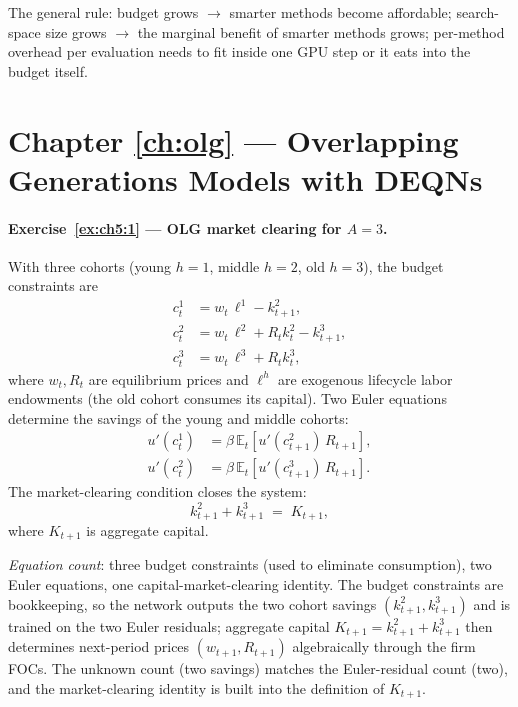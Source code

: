 \documentclass[11pt,a4paper]{report}
\begin{document}
The general rule: budget grows $\to$ smarter methods become affordable; search-space size grows $\to$ the marginal benefit of smarter methods grows; per-method overhead per evaluation needs to fit inside one GPU step or it eats into the budget itself.

\section{Chapter \ref{ch:olg} --- Overlapping Generations Models with DEQNs}
\label{sol:ch5}

\paragraph{Exercise~\ref{ex:ch5:1} --- OLG market clearing for $A=3$.}
With three cohorts (young $h=1$, middle $h=2$, old $h=3$), the budget constraints are
\begin{align*}
   c^1_t &= w_t \,\ell^1 - k^2_{t+1}, \\
   c^2_t &= w_t \,\ell^2 + R_t k^2_t - k^3_{t+1}, \\
   c^3_t &= w_t \,\ell^3 + R_t k^3_t,
\end{align*}
where $w_t, R_t$ are equilibrium prices and $\ell^h$ are exogenous lifecycle labor endowments (the old cohort consumes its capital).  Two Euler equations determine the savings of the young and middle cohorts:
\begin{align*}
u'(c^1_t) &= \beta\,\mathbb{E}_t[u'(c^2_{t+1})\,R_{t+1}], \\
u'(c^2_t) &= \beta\,\mathbb{E}_t[u'(c^3_{t+1})\,R_{t+1}].
\end{align*}
The market-clearing condition closes the system:
\[
   k^2_{t+1} + k^3_{t+1} \;=\; K_{t+1},
\]
where $K_{t+1}$ is aggregate capital.

\emph{Equation count}: three budget constraints (used to eliminate consumption), two Euler equations, one capital-market-clearing identity.  The budget constraints are bookkeeping, so the network outputs the two cohort savings $(k^2_{t+1}, k^3_{t+1})$ and is trained on the two Euler residuals; aggregate capital $K_{t+1} = k^2_{t+1} + k^3_{t+1}$ then determines next-period prices $(w_{t+1}, R_{t+1})$ algebraically through the firm FOCs.  The unknown count (two savings) matches the Euler-residual count (two), and the market-clearing identity is built into the definition of $K_{t+1}$.
\end{document}
